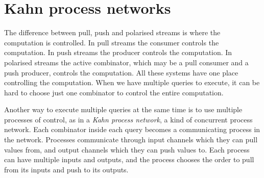 % 
% 
% 
% 
% 

\section{Kahn process networks}
\label{taxonomy/kpn}

The difference between pull, push and polarised streams is where the computation is controlled.
In pull streams the consumer controls the computation.
In push streams the producer controls the computation.
In polarised streams the active combinator, which may be a pull consumer and a push producer, controls the computation.
All these systems have one place controlling the computation.
When we have multiple queries to execute, it can be hard to choose just one combinator to control the entire computation.

Another way to execute multiple queries at the same time is to use multiple processes of control, as in a \emph{Kahn process network}, a kind of concurrent process network.
Each combinator inside each query becomes a communicating process in the network.
Processes communicate through input channels which they can pull values from, and output channels which they can push values to.
Each process can have multiple inputs and outputs, and the process chooses the order to pull from its inputs and push to its outputs.

